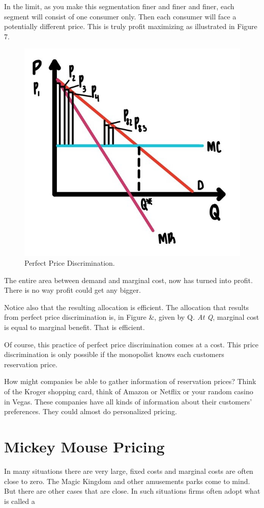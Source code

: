 \documentclass[
]{book}
\begin{document}
In the limit, as you make this segmentation finer and finer and finer, each segment will consist of one consumer only. Then each consumer will face a potentially different price. This is truly profit maximizing as illustrated in Figure 7.

\begin{figure}

{\centering \includegraphics[width=0.5\linewidth]{img/monopoly/fig8} 

}

\caption{Perfect Price Discrimination.}\label{fig:monopoly08}
\end{figure}

The entire area between demand and marginal cost, now has turned into profit. There is no way profit could get any bigger.

Notice also that the resulting allocation is efficient. The allocation that results from perfect price discrimination is, in Figure \&, given by Q\emph{. At Q}, marginal cost is equal to marginal benefit. That is efficient.

Of course, this practice of perfect price discrimination comes at a cost. This price discrimination is only possible if the monopolist knows each customers reservation price.

How might companies be able to gather information of reservation prices? Think of the Kroger shopping card, think of Amazon or Netflix or your random casino in Vegas. These companies have all kinds of information about their customers' preferences. They could almost do personalized pricing.

\hypertarget{mickey-mouse-pricing}{%
\section{Mickey Mouse Pricing}\label{mickey-mouse-pricing}}

In many situations there are very large, fixed costs and marginal costs are often close to zero. The Magic Kingdom and other amusements parks come to mind. But there are other cases that are close. In such situations firms often adopt what is called a
\end{document}
